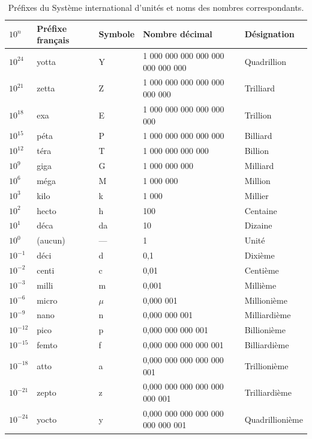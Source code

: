 \documentclass[a4paper,12pt]{book}
\begin{document}
\begin{table}
\begin{tabular}{|l|l|l|l|l|}
\hline
$10^n$&Préfixe français&Symbole&Nombre décimal&Désignation\\
\hline\hline
$10^{24}$&yotta&Y&1 000 000 000 000 000 000 000 000&Quadrillion\\
\hline
$10^{21}$&zetta&Z&1 000 000 000 000 000 000 000&Trilliard\\
\hline
$10^{18}$&exa&E&1 000 000 000 000 000 000&Trillion\\
\hline
$10^{15}$&péta&P&1 000 000 000 000 000&Billiard\\
\hline
$10^{12}$&téra&T&1 000 000 000 000&Billion\\
\hline
$10^{9}$&giga&G&1 000 000 000&Milliard\\
\hline
$10^{6}$&méga&M&1 000 000&Million\\
\hline
$10^{3}$&kilo&k&1 000&Millier\\
\hline
$10^{2}$&hecto&h&100&Centaine\\
\hline
$10^{1}$&déca&da&10&Dizaine\\
\hline
$10^{0}$&(aucun)&—&1&Unité\\
\hline
$10^{-1}$&déci&d&0,1&Dixième\\
\hline
$10^{-2}$&centi&c&0,01&Centième\\
\hline
$10^{-3}$&milli&m&0,001&Millième\\
\hline
$10^{-6}$&micro&$\mu$&0,000 001&Millionième\\
\hline
$10^{-9}$&nano&n&0,000 000 001&Milliardième\\
\hline
$10^{-12}$&pico&p&0,000 000 000 001&Billionième\\
\hline
$10^{-15}$&femto&f&0,000 000 000 000 001&Billiardième\\
\hline
$10^{-18}$&atto&a&0,000 000 000 000 000 001&Trillionième\\
\hline
$10^{-21}$&zepto&z&0,000 000 000 000 000 000 001&Trilliardième\\
\hline
$10^{-24}$&yocto&y&0,000 000 000 000 000 000 000 001&Quadrillionième\\
\hline
\end{tabular}
\caption{Préfixes du Système international d'unités et noms des nombres correspondants.}
\label{table_prefixe}
\end{table}
\end{document}
